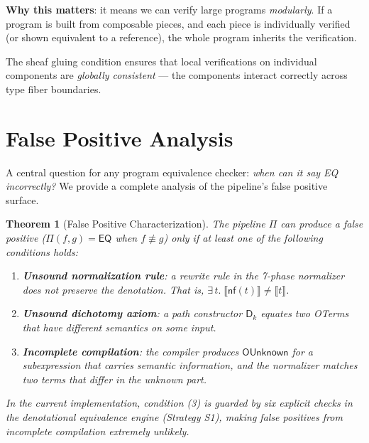 \documentclass[11pt,a4paper]{report}
\theoremstyle{definition}
\theoremstyle{plain}
\newtheorem{theorem}[definition]{Theorem}
\newcommand{\den}[1]{\llbracket #1 \rrbracket}
\begin{document}
\textbf{Why this matters}: it means we can verify large programs
\emph{modularly}.  If a program is built from composable pieces,
and each piece is individually verified (or shown equivalent to a
reference), the whole program inherits the verification.

The sheaf gluing condition ensures that local verifications on
individual components are \emph{globally consistent} --- the
components interact correctly across type fiber boundaries.

\section{False Positive Analysis}
\label{sec:false-positive}

A central question for any program equivalence checker: \emph{when can
it say EQ incorrectly?}  We provide a complete analysis of the
pipeline's false positive surface.

\begin{theorem}[False Positive Characterization]
\label{thm:false-positive}
The pipeline $\Pi$ can produce a false positive
($\Pi(f,g) = \mathsf{EQ}$ when $f \not\equiv g$) \emph{only if}
at least one of the following conditions holds:
\begin{enumerate}
  \item \textbf{Unsound normalization rule}: a rewrite rule in the
    7-phase normalizer does not preserve the denotation.  That is,
    $\exists\, t.\; \den{\mathsf{nf}(t)} \neq \den{t}$.

  \item \textbf{Unsound dichotomy axiom}: a path constructor
    $\mathsf{D}_k$ equates two OTerms that have different semantics
    on some input.

  \item \textbf{Incomplete compilation}: the compiler produces
    $\mathsf{OUnknown}$ for a subexpression that carries semantic
    information, and the normalizer matches two terms that differ
    in the unknown part.
\end{enumerate}
In the current implementation, condition (3) is guarded by six
explicit checks in the denotational equivalence engine
(Strategy S1), making false positives from incomplete compilation
extremely unlikely.
\end{theorem}
\end{document}
